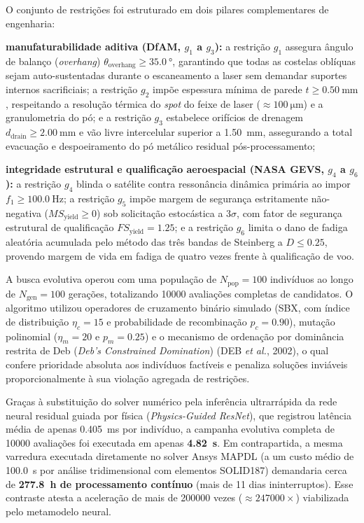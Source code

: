 O conjunto de restrições foi estruturado em dois pilares complementares de engenharia:
\begin{alineas}
  \item \textbf{manufaturabilidade aditiva (DfAM, $g_1$ a $g_3$):} a restrição $g_1$ assegura ângulo de balanço (\textit{overhang}) $\theta_{\text{overhang}} \ge \SI{35.0}{\degree}$, garantindo que todas as costelas oblíquas sejam auto-sustentadas durante o escaneamento a laser sem demandar suportes internos sacrificiais; a restrição $g_2$ impõe espessura mínima de parede $t \ge \SI{0.50}{\milli\metre}$, respeitando a resolução térmica do \textit{spot} do feixe de laser ($\approx \SI{100}{\micro\metre}$) e a granulometria do pó; e a restrição $g_3$ estabelece orifícios de drenagem $d_{\text{drain}} \ge \SI{2.00}{\milli\metre}$ e vão livre intercelular superior a \SI{1.50}{\milli\metre}, assegurando a total evacuação e despoeiramento do pó metálico residual pós-processamento;
  \item \textbf{integridade estrutural e qualificação aeroespacial (NASA GEVS, $g_4$ a $g_6$):} a restrição $g_4$ blinda o satélite contra ressonância dinâmica primária ao impor $f_1 \ge \SI{100.0}{\hertz}$; a restrição $g_5$ impõe margem de segurança estritamente não-negativa ($MS_{\text{yield}} \ge 0$) sob solicitação estocástica a $3\sigma$, com fator de segurança estrutural de qualificação $FS_{\text{yield}} = \num{1.25}$; e a restrição $g_6$ limita o dano de fadiga aleatória acumulada pelo método das três bandas de Steinberg a $D \le \num{0.25}$, provendo margem de vida em fadiga de quatro vezes frente à qualificação de voo.
\end{alineas}

A busca evolutiva operou com uma população de $N_{\text{pop}} = 100$ indivíduos ao longo de $N_{\text{gen}} = 100$ gerações, totalizando \num{10000} avaliações completas de candidatos. O algoritmo utilizou operadores de cruzamento binário simulado (SBX, com índice de distribuição $\eta_c = 15$ e probabilidade de recombinação $p_c = \num{0.90}$), mutação polinomial ($\eta_m = 20$ e $p_m = \num{0.25}$) e o mecanismo de ordenação por dominância restrita de Deb (\textit{Deb's Constrained Domination}) (DEB \textit{et al.}, 2002), o qual confere prioridade absoluta aos indivíduos factíveis e penaliza soluções inviáveis proporcionalmente à sua violação agregada de restrições.

Graças à substituição do solver numérico pela inferência ultrarrápida da rede neural residual guiada por física (\textit{Physics-Guided ResNet}), que registrou latência média de apenas \SI{0.405}{\milli\second} por indivíduo, a campanha evolutiva completa de \num{10000} avaliações foi executada em apenas \textbf{\SI{4.82}{\second}}. Em contrapartida, a mesma varredura executada diretamente no solver Ansys MAPDL (a um custo médio de \SI{100.0}{\second} por análise tridimensional com elementos SOLID187) demandaria cerca de \textbf{\SI{277.8}{\hour} de processamento contínuo} (mais de 11 dias ininterruptos). Esse contraste atesta a aceleração de mais de \num{200000} vezes ($\approx \num{247000}\times$) viabilizada pelo metamodelo neural.

